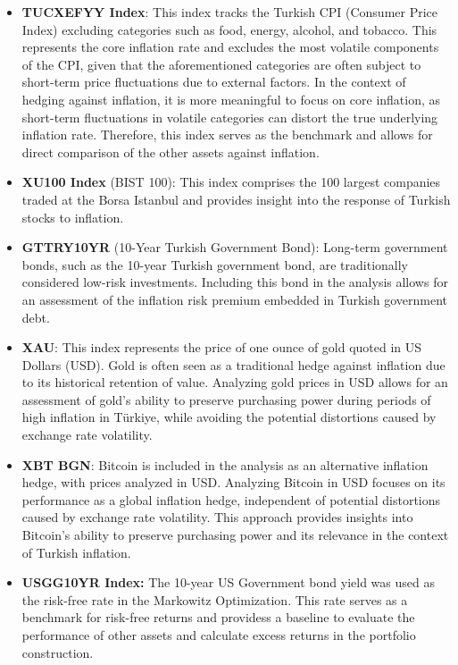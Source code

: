 \documentclass[
]{article}
\begin{document}
\begin{itemize}
\item
  \textbf{TUCXEFYY Index}: This index tracks the Turkish CPI (Consumer
  Price Index) excluding categories such as food, energy, alcohol, and
  tobacco. This represents the core inflation rate and excludes the most
  volatile components of the CPI, given that the aforementioned
  categories are often subject to short-term price fluctuations due to
  external factors. In the context of hedging against inflation, it is
  more meaningful to focus on core inflation, as short-term fluctuations
  in volatile categories can distort the true underlying inflation rate.
  Therefore, this index serves as the benchmark and allows for direct
  comparison of the other assets against inflation.
\item
  \textbf{XU100 Index} (BIST 100): This index comprises the 100 largest
  companies traded at the Borsa Istanbul and provides insight into the
  response of Turkish stocks to inflation.
\item
  \textbf{GTTRY10YR} (10-Year Turkish Government Bond): Long-term
  government bonds, such as the 10-year Turkish government bond, are
  traditionally considered low-risk investments. Including this bond in
  the analysis allows for an assessment of the inflation risk premium
  embedded in Turkish government debt.
\item
  \textbf{XAU}: This index represents the price of one ounce of gold
  quoted in US Dollars (USD). Gold is often seen as a traditional hedge
  against inflation due to its historical retention of value. Analyzing
  gold prices in USD allows for an assessment of gold's ability to
  preserve purchasing power during periods of high inflation in Türkiye,
  while avoiding the potential distortions caused by exchange rate
  volatility.
\item
  \textbf{XBT BGN}: Bitcoin is included in the analysis as an
  alternative inflation hedge, with prices analyzed in USD. Analyzing
  Bitcoin in USD focuses on its performance as a global inflation hedge,
  independent of potential distortions caused by exchange rate
  volatility. This approach provides insights into Bitcoin's ability to
  preserve purchasing power and its relevance in the context of Turkish
  inflation.
\item 
  \textbf{USGG10YR Index:} The 10-year US Government bond yield was used as the risk-free rate in the Markowitz Optimization. This rate serves as a benchmark for risk-free returns and providess a baseline to evaluate the performance of other assets and calculate excess returns in the portfolio construction.
\end{itemize}
\end{document}
